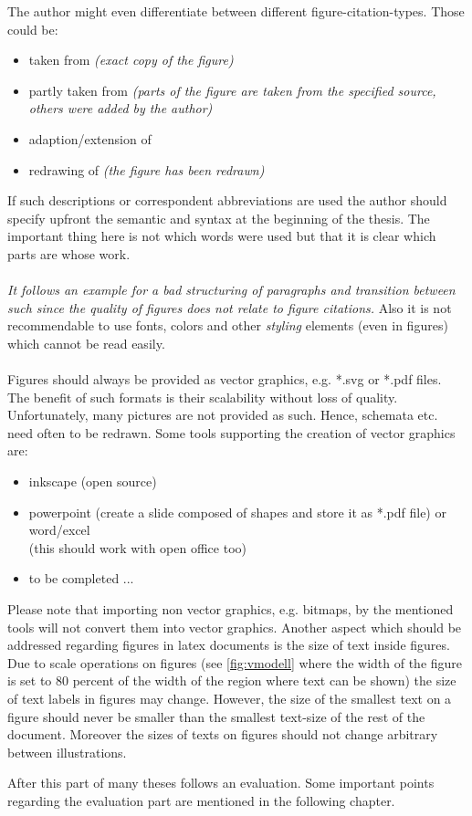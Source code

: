 The author might even differentiate between different figure-citation-types.
Those could be:
\begin{itemize}
  \item taken from \textit{(exact copy of the figure)}
  \item partly taken from \textit{(parts of the figure are taken from the specified source, others were added by the author)}
  \item adaption/extension of
  \item redrawing of \textit{(the figure has been redrawn)}
\end{itemize}
If such descriptions or correspondent abbreviations are used the author should specify upfront the semantic and syntax at the beginning of the thesis.
The important thing here is not which words were used but that it is clear which parts are whose work.
\\\\
\textsl{\textcolor[rgb]{0.75,0.75,0.75}{It follows an example for a bad structuring of paragraphs and transition between such since the quality of figures does not relate to figure citations.}}
Also it is not recommendable to use fonts, \textcolor[rgb]{1,1,0}{colors} and other \textsl{\textit{\colorbox[rgb]{1,1,0.6}{\textcolor[rgb]{0.8,1,0.8}{styling}}}} elements (even in figures) which cannot be read easily.
\\\\
Figures should always be provided as vector graphics, e.g. *.svg or *.pdf files.
The benefit of such formats is their scalability without loss of quality.
Unfortunately, many pictures are not provided as such.
Hence, schemata etc. need often to be redrawn.
Some tools supporting the creation of vector graphics are:
\begin{itemize}
  \item inkscape (open source)
  \item powerpoint (create a slide composed of shapes and store it as *.pdf file) or word/excel\\
        (this should work with open office too)
  \item to be completed ...
\end{itemize}
Please note that importing non vector graphics, e.g. bitmaps, by the mentioned tools will not convert them into vector graphics.
Another aspect which should be addressed regarding figures in latex documents is the size of text inside figures.
Due to scale operations on figures (see \ref{fig:vmodell} where the width of the figure is set to 80 percent of the width of the region where text can be shown) the size of text labels in figures may change.
However, the size of the smallest text on a figure should never be smaller than the smallest text-size of the rest of the document.
Moreover the sizes of texts on figures should not change arbitrary between illustrations.

After this part of many theses follows an evaluation.
Some important points regarding the evaluation part are mentioned in the following chapter.